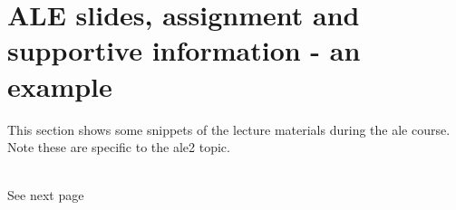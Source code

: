 \chapter{ALE slides, assignment and supportive information -  an example}\label{appendices:slide_assignment_info}
This section shows some snippets of the lecture materials during the \acrshort{ale} course. Note these are specific to the \acrshort{ale}2 topic.\\\\
\begin{minipage}{0.5\textwidth}
\begin{flushleft}
\end{flushleft}
\end{minipage}
\hfill
\begin{minipage}{0.5\textwidth}
\begin{flushright}
   See next page
\end{flushright}
\end{minipage}


